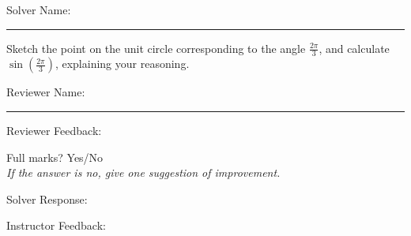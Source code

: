 \documentclass[12pt]{exam}
\begin{document}
\pagestyle{headandfoot}
\firstpageheadrule

Solver Name:\enspace\rule{5cm}{0.8pt}

\begin{questions}
\question
Sketch the point on the unit circle corresponding to the angle $\frac{2\pi}3$, and calculate $\sin\left(\frac{2\pi}3\right)$, explaining your reasoning.

\end{questions}

Reviewer Name:\enspace\rule{5cm}{0.8pt}

\begin{questions}
\question

Reviewer Feedback:

Full marks? Yes/No\\
\textit{If the answer is no, give one suggestion of improvement.}
\question

Solver Response:


\question

Instructor Feedback:



\end{questions}
\end{document}
